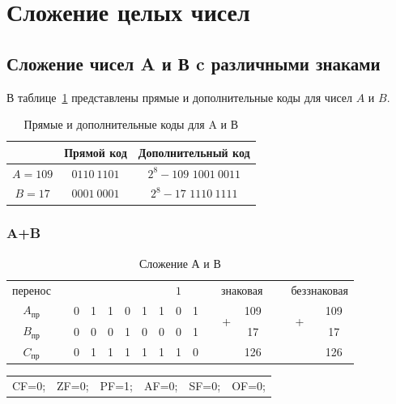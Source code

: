 \section{Сложение целых чисел}
\subsection{Сложение чисел A и В c различными знаками}

В таблице~\ref{tab:a-b-dop} представлены прямые и дополнительные коды
для чисел $A$ и $B$.

\begin{table}[H]
    \centering
    \caption{Прямые и дополнительные коды для A и В}
	\label{tab:a-b-dop}
    \begin{tabular}{|c|c|c|}
		\hline
		 & Прямой код & Дополнительный код \\
		\hline
		$A=109$ & $0110\ 1101$ & \makecell{$2^8-109$\\$1001\ 0011$}  \\
		\hline
		$B=17$ & $0001\ 0001$ & \makecell{$2^8-17$\\$1110\ 1111$} \\
		\hline
    \end{tabular}
\end{table}

\subsubsection{A+B}

\begin{table}[H]
    \centering
    \caption{Сложение А и В}
    \begin{tabular}{c|cc|cccccccp{1cm}ccp{0.5cm}cc}
		\small перенос & & & & & & & & $1$ & & & \multicolumn{2}{c}{знаковая} & \  & \multicolumn{2}{c}{беззнаковая}  \\
		\cline{1-10} \cline{12-13} \cline{15-16}
		$A_{\text{пр}}$ & & 0 & 1 & 1 & 0 & 1 & 1 & 0 & 1 & & \multirow{2}{*}{+} & 109 & \  & \multirow{2}{*}{+} & 109   \\
		$B_{\text{пр}}$ & & 0 & 0 & 0 & 1 & 0 & 0 & 0 & 1 & & & 17 & \  &  & 17 \\
		\cline{1-10} \cline{12-13} \cline{15-16}
		$C_{\text{пр}}$ & & 0 & 1 & 1 & 1 & 1 & 1 & 1 & 0 & & & 126 & \  &  & 126 \\
    \end{tabular}
\end{table}

\begin{table}[H]
    \centering
    \begin{tabular}{cccccc}
        CF=0; & ZF=0; & PF=1; & AF=0; & SF=0; & OF=0;
    \end{tabular}
\end{table}

